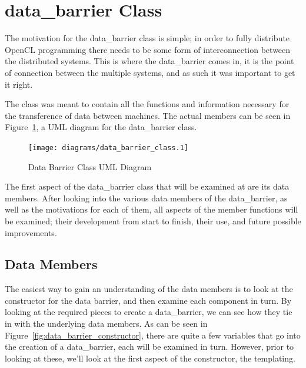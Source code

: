 \documentclass[../thesis.tex]{subfiles}
\begin{document}
\section{data\_barrier Class} %

The motivation for the data\_barrier class is simple; in order to fully distribute OpenCL programming there needs to be some form of interconnection between the distributed systems. This is where the data\_barrier comes in, it is the point of connection between the multiple systems, and as such it was important to get it right.

The class was meant to contain all the functions and information necessary for the transference of data between machines. The actual members can be seen in Figure~\ref{fig:data_barrier_class}, a UML diagram for the data\_barrier class.

\begin{figure}[htbp]
  \centering
  \texttt{[image: diagrams/data\_barrier\_class.1]}
  \caption{Data Barrier Class UML Diagram}
  \label{fig:data_barrier_class}
\end{figure}

The first aspect of the data\_barrier class that will be examined at are its data members. After looking into the various data members of the data\_barrier, as well as the motivations for each of them, all aspects of the member functions will be examined; their development from start to finish, their use, and future possible improvements.

\subsection{Data Members} %
\label{sub:data_members}
  The easiest way to gain an understanding of the data members is to look at the constructor for the data barrier, and then examine each component in turn. By looking at the required pieces to create a data\_barrier, we can see how they tie in with the underlying data members. As can be seen in Figure~\ref{fig:data_barrier_constructor}, there are quite a few variables that go into the creation of a data\_barrier, each will be examined in turn. However, prior to looking at these, we'll look at the first aspect of the constructor, the templating.
\end{document}
